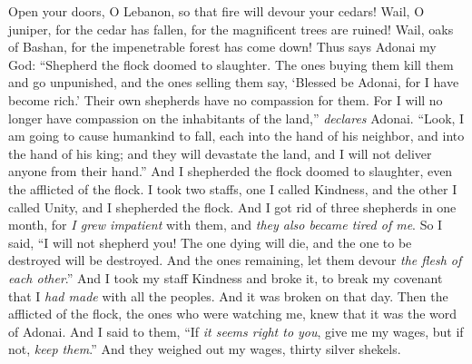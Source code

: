 \begin{biblechapter} %
\verse Open your doors, O Lebanon,
\verse so that fire will devour your cedars!
\verse Wail, O juniper, for the cedar has fallen, 
for the magnificent trees are ruined! 
Wail, oaks of Bashan, 
for the impenetrable forest has come down!
 Thus says Adonai my God: “Shepherd the flock doomed to slaughter.
\verse The ones buying them kill them and go unpunished, and the ones selling them say, ‘Blessed be Adonai, for I have become rich.’ Their own shepherds have no compassion for them.
\verse For I will no longer have compassion on the inhabitants of the land,” \textit{declares} Adonai. “Look, I am going to cause humankind to fall, each into the hand of his neighbor, and into the hand of his king; and they will devastate the land, and I will not deliver anyone from their hand.”
\verse And I shepherded the flock doomed to slaughter, even the afflicted of the flock. I took two staffs, one I called Kindness, and the other I called Unity, and I shepherded the flock.
\verse And I got rid of three shepherds in one month, for \textit{I grew impatient} with them, and \textit{they also became tired of me}.
\verse So I said, “I will not shepherd you! The one dying will die, and the one to be destroyed will be destroyed. And the ones remaining, let them devour \textit{the flesh of each other}.”
\verse And I took my staff Kindness and broke it, to break my covenant that I \textit{had made} with all the peoples.
\verse And it was broken on that day. Then the afflicted of the flock, the ones who were watching me, knew that it was the word of Adonai.
\verse And I said to them, “If \textit{it seems right to you}, give me my wages, but if not, \textit{keep them}.” And they weighed out my wages, thirty silver shekels.

\end{biblechapter}
